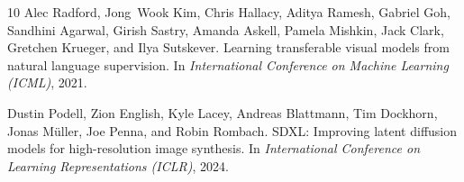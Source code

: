 \documentclass{article}
\begin{document}
\begin{thebibliography}{10}
Alec Radford, Jong~Wook Kim, Chris Hallacy, Aditya Ramesh, Gabriel Goh, Sandhini Agarwal, Girish Sastry, Amanda Askell, Pamela Mishkin, Jack Clark, Gretchen Krueger, and Ilya Sutskever.
\newblock Learning transferable visual models from natural language supervision.
\newblock In \emph{International Conference on Machine Learning (ICML)}, 2021.

Dustin Podell, Zion English, Kyle Lacey, Andreas Blattmann, Tim Dockhorn, Jonas M\"{u}ller, Joe Penna, and Robin Rombach.
\newblock SDXL: Improving latent diffusion models for high-resolution image synthesis.
\newblock In \emph{International Conference on Learning Representations (ICLR)}, 2024.

\end{thebibliography}
\end{document}
